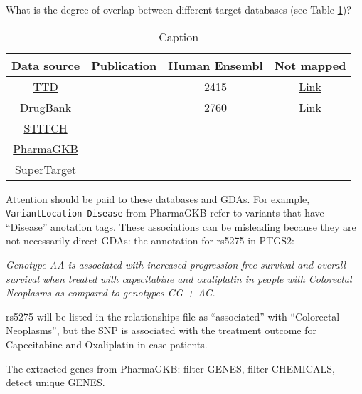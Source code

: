 What is the degree of overlap between different target databases (see Table \ref{tab:target_db_stats})?

\begin{table}[H]
    \centering
    \begin{tabular}{c|c|c|c}
         Data source & Publication & Human Ensembl & Not mapped \\
         \hline
         
         \href{https://goo.gl/VD1dTm}{TTD} &
         \cite{ttd2018} & 2415 & \href{https://goo.gl/pvWxHf}{Link}
         \\
         
         \href{https://goo.gl/Lrsyde}{DrugBank} &
         \cite{drugbank2008} & 2760 & \href{https://goo.gl/cYYa3F}{Link} \\
         
         \href{https://goo.gl/BY8yw8}{STITCH} &
         \cite{stitch42014} & &
         \\
         
         \href{https://goo.gl/mXCn7a}{PharmaGKB} &
         \cite{pharmaGSK2012} & &
         \\
         
         \href{https://goo.gl/uUPmwo}{SuperTarget} & \cite{superTarget2012} & &
         
    \end{tabular}
    \caption{Caption \label{tab:target_db_stats}}
\end{table}

Attention should be paid to these databases and GDAs. For example, \texttt{VariantLocation-Disease} from PharmaGKB refer to variants that have ``Disease'' anotation tags. These associations can be misleading because they are not necessarily direct GDAs: the annotation for rs5275 in PTGS2:

\begin{center}
    \emph{Genotype AA is associated with increased progression-free survival and overall survival when treated with capecitabine and oxaliplatin in people with Colorectal Neoplasms as compared to genotypes GG + AG}.
\end{center}

rs5275 will be listed in the relationships file as “associated” with “Colorectal Neoplasms”, but the SNP is associated with the treatment outcome for Capecitabine and Oxaliplatin in case patients.

The extracted genes from PharmaGKB: filter GENES, filter CHEMICALS, detect unique GENES.

 
 